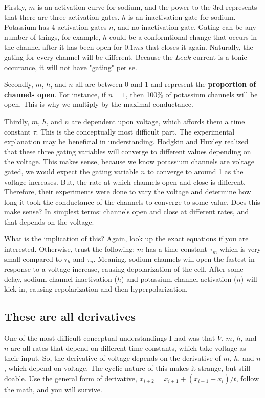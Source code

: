 \documentclass[12pt]{amsart}
\begin{document}
Firstly, $m$ is an activation curve for sodium, and the power to the 3rd represents that there are three activation gates. $h$ is an inactivation gate for sodium. Potassium has 4 activation gates $n$, and no inactivation gate. Gating can be any number of things, for example, $h$ could be a conformtional change that occurs in the channel after it has been open for $0.1 ms$ that closes it again. Naturally, the gating for every channel will be different. Because the $Leak$ current is a tonic occurance, it will not have "gating" per se.\newline

Secondly, $m$, $h$, and $n$ all are between 0 and 1 and represent the \textbf{proportion of channels open}. For instance, if $n = 1$, then 100\% of potassium channels will be open. This is why we multiply by the maximal conductance.\newline

Thirdly, $m$, $h$, and $n$ are dependent upon voltage, which affords them a time constant $\tau$. This is the conceptually most difficult part. The experimental explanation may be beneficial in understanding. Hodgkin and Huxley realized that these three gating variables will converge to different values depending on the voltage. This makes sense, because we know potassium channels are voltage gated, we would expect the gating variable $n$ to converge to around 1 as the voltage increases. But, the rate at which channels open and close is different. Therefore, their experiments were done to vary the voltage and determine how long it took the conductance of the channels to converge to some value. Does this make sense? In simplest terms: channels open and close at different rates, and that depends on the voltage.\newline

What is the implication of this? Again, look up the exact equations if you are interested. Otherwise, trust the following: $m$ has a time constant $\tau_m$ which is very small compared to $\tau_h$ and $\tau_n$. Meaning, sodium channels will open the fastest in response to a voltage increase, causing depolarization of the cell. After some delay, sodium channel inactivation ($h$) and potassium channel activation ($n$) will kick in, causing repolarization and then hyperpolarization. 

\subsection{These are all derivatives} One of the most difficult conceptual understandings I had was that $\dot{V}$, $m$, $h$, and $n$ are all rates that depend on different time constants, which take voltage as their input. So, the derivative of voltage depends on the derivative of $m$, $h$, and $n$, which depend on voltage. The cyclic nature of this makes it strange, but still doable. Use the general form of derivative, $x_{i+2} = x_{i+1} + (x_{i+1} - x_i)/t$, follow the math, and you will survive.
\end{document}
